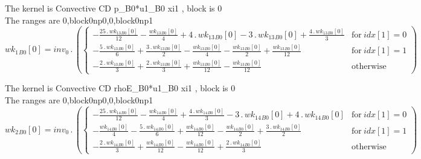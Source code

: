 \documentclass{article}
\begin{document}
\noindent The kernel is Convective CD p_B0*u1_B0 xi1 , block is 0\\\noindent The ranges are 0,block0np0,0,block0np1\\\begin{dmath}{wk_{1}{_{B0}}}[{0}] = inv_0 \,.\, \left(\begin{cases} - \frac{25 \,.\, {wk_{13}{_{B0}}}[{0}]}{12} - \frac{{wk_{13}{_{B0}}}[{0}]}{4} + 4 \,.\, {wk_{13}{_{B0}}}[{0}] - 3 \,.\, {wk_{13}{_{B0}}}[{0}] + \frac{4 \,.\, 
{wk_{13}{_{B0}}}[{0}]}{3} & \text{for}\: {idx}[{1}] = 0 \\- \frac{5 \,.\, {wk_{13}{_{B0}}}[{0}]}{6} + \frac{3 \,.\, {wk_{13}{_{B0}}}[{0}]}{2} - \frac{{wk_{13}{_{B0}}}[{0}]}{4} - \frac{{wk_{13}{_{B0}}}[{0}]}{2} + \frac{{wk_{13}{_{B0}}}[{0}]}{12} & 
\text{for}\: {idx}[{1}] = 1 \\- \frac{2 \,.\, {wk_{13}{_{B0}}}[{0}]}{3} + \frac{2 \,.\, {wk_{13}{_{B0}}}[{0}]}{3} + \frac{{wk_{13}{_{B0}}}[{0}]}{12} - \frac{{wk_{13}{_{B0}}}[{0}]}{12} & \text{otherwise} \end{cases}\right)\end{dmath}

\noindent The kernel is Convective CD rhoE_B0*u1_B0 xi1 , block is 0\\\noindent The ranges are 0,block0np0,0,block0np1\\\begin{dmath}{wk_{2}{_{B0}}}[{0}] = inv_0 \,.\, \left(\begin{cases} - \frac{25 \,.\, {wk_{14}{_{B0}}}[{0}]}{12} - \frac{{wk_{14}{_{B0}}}[{0}]}{4} + \frac{4 \,.\, {wk_{14}{_{B0}}}[{0}]}{3} - 3 \,.\, {wk_{14}{_{B0}}}[{0}] + 4 \,.\, 
{wk_{14}{_{B0}}}[{0}] & \text{for}\: {idx}[{1}] = 0 \\- \frac{{wk_{14}{_{B0}}}[{0}]}{4} - \frac{5 \,.\, {wk_{14}{_{B0}}}[{0}]}{6} + \frac{{wk_{14}{_{B0}}}[{0}]}{12} - \frac{{wk_{14}{_{B0}}}[{0}]}{2} + \frac{3 \,.\, {wk_{14}{_{B0}}}[{0}]}{2} & 
\text{for}\: {idx}[{1}] = 1 \\- \frac{2 \,.\, {wk_{14}{_{B0}}}[{0}]}{3} + \frac{{wk_{14}{_{B0}}}[{0}]}{12} - \frac{{wk_{14}{_{B0}}}[{0}]}{12} + \frac{2 \,.\, {wk_{14}{_{B0}}}[{0}]}{3} & \text{otherwise} \end{cases}\right)\end{dmath}
\end{document}
